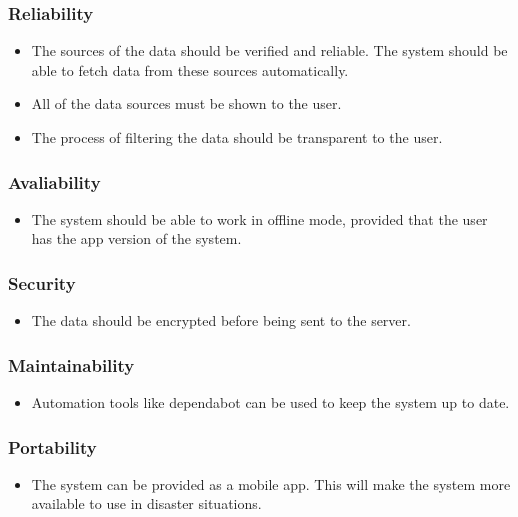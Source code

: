 \documentclass[a4paper]{article}
\begin{document}
        \subsubsection{Reliability}
            \begin{itemize}
                \item The sources of the data should be verified and reliable. The system should be able to fetch data from these sources automatically.
                \item All of the data sources must be shown to the user.
                \item The process of filtering the data should be transparent to the user.
            \end{itemize}

            \subsubsection{Avaliability}
            \begin{itemize}
                \item The system should be able to work in offline mode, provided that the user has the app version of the system.
            \end{itemize}
            
            \subsubsection{Security}
            \begin{itemize}
                \item The data should be encrypted before being sent to the server.
            \end{itemize}

            \subsubsection{Maintainability}
            \begin{itemize}
                \item Automation tools like dependabot can be used to keep the system up to date.
            \end{itemize}

            \subsubsection{Portability}
            \begin{itemize}
                \item The system can be provided as a mobile app. This will make the system more available to use in disaster situations.
            \end{itemize}
\end{document}
